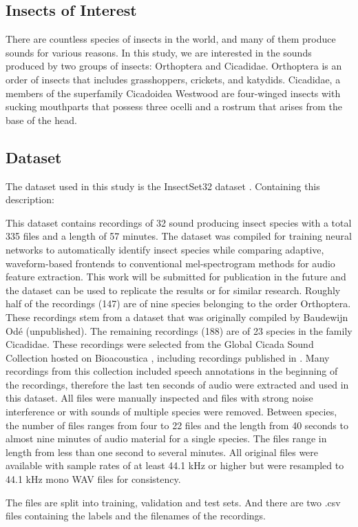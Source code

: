 \subsection{Insects of Interest}
There are countless species of insects in the world, and many of them produce sounds for various reasons.
In this study, we are interested in the sounds produced by two groups of insects: Orthoptera and Cicadidae.
Orthoptera is an order of insects that includes grasshoppers, crickets, and katydids. \autocite{capineraOrthoptera2008}
Cicadidae, a members of the superfamily Cicadoidea Westwood are four-winged insects with sucking 
mouthparts that possess three ocelli and a rostrum that arises from the base of the head. \autocite{sanbornCicadasHemipteraCicadoidea2008}

\subsection{Dataset}

The dataset used in this study is the InsectSet32 dataset \autocite{faissInsectSet32DatasetAutomatic2022}. 
Containing this description:

This dataset contains recordings of 32 sound producing insect species with a total 335 files and a length of 57 minutes. 
The dataset was compiled for training neural networks to automatically identify insect species while comparing adaptive, 
waveform-based frontends to conventional mel-spectrogram methods for audio feature extraction. 
This work will be submitted for publication in the future and the dataset can be used to replicate the results or for similar research. 
Roughly half of the recordings (147) are of nine species belonging to the order Orthoptera. 
These recordings stem from a dataset that was originally compiled by Baudewijn Odé (unpublished). 
The remaining recordings (188) are of 23 species in the family Cicadidae. 
These recordings were selected from the Global Cicada Sound Collection hosted on Bioacoustica \autocite{bakerBioAcousticaFreeOpen2015}, 
including recordings published in \autocites{bakerGlobalCicadaSound2015}{poppleRevisionMyopsaltaCrucifera2017}.
Many recordings from this collection included speech annotations in the beginning of the recordings, 
therefore the last ten seconds of audio were extracted and used in this dataset. 
All files were manually inspected and files with strong noise interference or with sounds of multiple species were removed. 
Between species, the number of files ranges from four to 22 files and the length from 40 seconds to almost nine minutes of audio material for a single species. 
The files range in length from less than one second to several minutes. 
All original files were available with sample rates of at least 44.1 kHz or higher but were resampled to 44.1 kHz mono WAV files for consistency.

The files are split into training, validation and test sets. And there are two .csv files containing
the labels and the filenames of the recordings.



